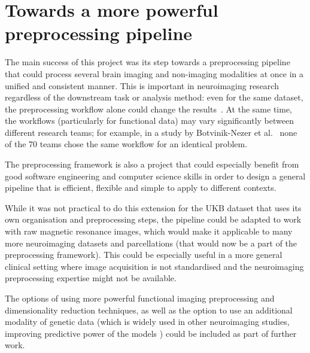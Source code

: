 \section{Towards a more powerful preprocessing pipeline}
The main success of this project was its step towards a preprocessing pipeline that could process several brain imaging and non-imaging modalities at once in a unified and consistent manner. This is important in neuroimaging research regardless of the downstream task or analysis method: even for the same dataset, the preprocessing workflow alone could change the results~\cite{salehi2020there}. At the same time, the workflows (particularly for functional data) may vary significantly between different research teams; for example, in a study by Botvinik-Nezer et al.~\cite{botvinik2019variability} none of the 70 teams chose the same workflow for an identical problem.

The preprocessing framework is also a project that could especially benefit from good software engineering and computer science skills in order to design a general pipeline that is efficient, flexible and simple to apply to different contexts.

While it was not practical to do this extension for the UKB dataset that uses its own organisation and preprocessing steps, the pipeline could be adapted to work with raw magnetic resonance images, which would make it applicable to many more neuroimaging datasets and parcellations (that would now be a part of the preprocessing framework). This could be especially useful in a more general clinical setting where image acquisition is not standardised and the neuroimaging preprocessing expertise might not be available.

The options of using more powerful functional imaging preprocessing and dimensionality reduction techniques, as well as the option to use an additional modality of genetic data (which is widely used in other neuroimaging studies, improving predictive power of the models \cite{cole2018brain,parisot2018disease}) could be included as part of further work.



